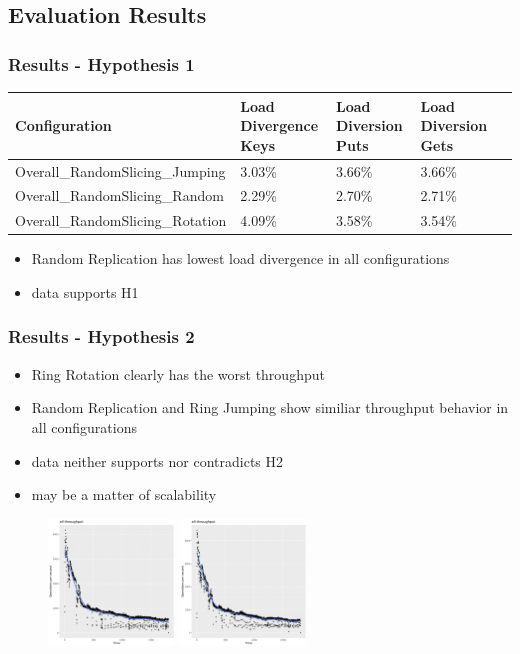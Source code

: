 \documentclass[aspectratio=169]{beamer}
\begin{document}
\subsection{Evaluation Results}
\begin{frame}
\frametitle{Results - Hypothesis 1}
\begin{table}
\begin{tabularx}{\textwidth}{|l|X|X|X|X|}
\hline
Configuration & Load Divergence Keys & Load Diversion Puts & Load Diversion Gets\\\hline
Overall\_RandomSlicing\_Jumping & 3.03\% & 3.66\% & 3.66\%\\
Overall\_RandomSlicing\_Random & 2.29\% & 2.70\% & 2.71\%\\
Overall\_RandomSlicing\_Rotation & 4.09\% & 3.58\% & 3.54\%\\
\hline
\end{tabularx}
\end{table}
\begin{itemize}
\item Random Replication has lowest load divergence in all configurations
\item data supports H1
\end{itemize}
\end{frame}

\begin{frame}
\frametitle{Results - Hypothesis 2}
\begin{itemize}
\item Ring Rotation clearly has the worst throughput
\item Random Replication and Ring Jumping show similiar throughput behavior in all configurations
\item data neither supports nor contradicts H2
\item may be a matter of scalability
\end{itemize}
\begin{figure}
\includegraphics[width=0.3\textwidth]{RandomSlicing_Random_C0_read_heavy_throughput}
\includegraphics[width=0.3\textwidth]{RandomSlicing_Jumping_C0_read_heavy_throughput}
\end{figure}
\end{frame}
\end{document}
